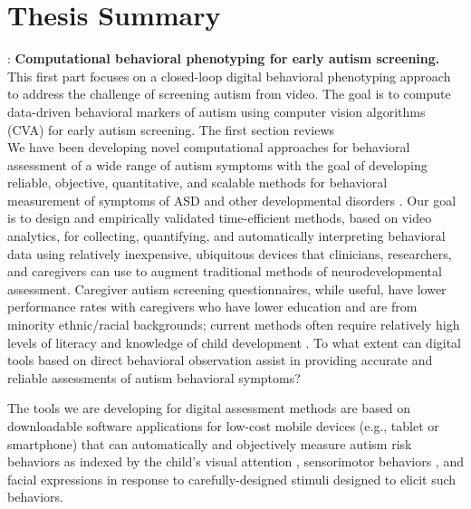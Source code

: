 \section*{Thesis Summary} 

\textbf{}: \textbf{Computational behavioral phenotyping for early autism screening.} This first part focuses on a closed-loop digital behavioral phenotyping approach to address the challenge of screening autism from video. The goal is to compute data-driven behavioral markers of autism using computer vision algorithms (CVA) for early autism screening. The first section reviews\\
We have been developing novel computational approaches for behavioral assessment of a wide range of autism symptoms with the goal of developing reliable, objective, quantitative, and scalable methods for behavioral measurement of symptoms of ASD and other developmental disorders \cite{CV1}.
Our goal is to design and empirically validated time-efficient methods, based on video analytics, for collecting, quantifying, and automatically interpreting behavioral data using relatively inexpensive, ubiquitous devices that clinicians, researchers, and caregivers can use to augment traditional methods of neurodevelopmental assessment. Caregiver autism screening questionnaires, while useful, have lower performance rates with caregivers who have lower education and are from minority ethnic/racial backgrounds; current methods often require relatively high levels of literacy and knowledge of child development \cite{Khowaja2014}. To what extent can digital tools based on direct behavioral observation assist in providing accurate and reliable assessments of autism behavioral symptoms? 

The tools we are developing for digital assessment methods are based on downloadable software applications for low-cost mobile devices (e.g., tablet or smartphone) that can automatically and objectively measure autism risk behaviors as indexed by the child’s visual attention \cite{CV_autism_1, team_article_2}, sensorimotor behaviors \cite{team_article_4}, and facial expressions \cite{Carpenter2020} in response to carefully-designed stimuli designed to elicit such behaviors. 




